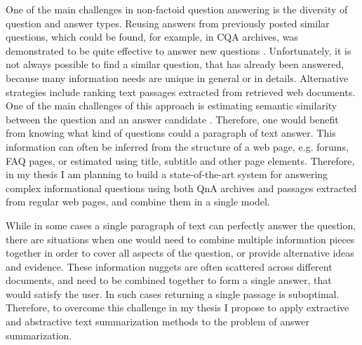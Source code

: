One of the main challenges in non-factoid question answering is the diversity of question and answer types.
Reusing answers from previously posted similar questions, which could be found, for example, in CQA archives, was demonstrated to be quite effective to answer new questions \cite{carmel2000eresponder,Shtok:2012:LPA:2187836.2187939}.
Unfortunately, it is not always possible to find a similar question, that has already been answered, because many information needs are unique in general or in details.
Alternative strategies include ranking text passages extracted from retrieved web documents.
One of the main challenges of this approach is estimating semantic similarity between the question and an answer candidate \cite{soricut2006automatic}.
Therefore, one would benefit from knowing what kind of questions could a paragraph of text answer.
This information can often be inferred from the structure of a web page, e.g. forums, FAQ pages, or estimated using title, subtitle and other page elements.
Therefore, in my thesis I am planning to build a state-of-the-art system for answering complex informational questions using both QnA archives and passages extracted from regular web pages, and combine them in a single model.

While in some cases a single paragraph of text can perfectly answer the question, there are situations when one would need to combine multiple information pieces together in order to cover all aspects of the question, or provide alternative ideas and evidence.
These information nuggets are often scattered across different documents, and need to be combined together to form a single answer, that would satisfy the user.
In such cases returning a single passage is suboptimal.
Therefore, to overcome this challenge in my thesis I propose to apply extractive and abstractive text summarization methods to the problem of answer summarization.


